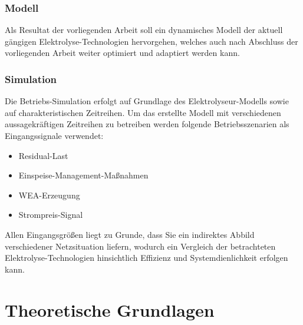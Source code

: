 \documentclass[onecolumn,10pt,titlepage]{article}
\begin{document}
\subsubsection{Modell}
Als Resultat der vorliegenden Arbeit soll ein dynamisches Modell der aktuell gängigen Elektrolyse-Technologien hervorgehen, welches auch nach Abschluss der vorliegenden Arbeit weiter optimiert und adaptiert werden kann.\\

\subsubsection{Simulation}
Die Betriebs-Simulation erfolgt auf Grundlage des Elektrolyseur-Modells sowie auf charakteristischen Zeitreihen. Um das erstellte Modell mit verschiedenen aussagekräftigen Zeitreihen zu betreiben werden folgende Betriebsszenarien als Eingangssignale verwendet:
\begin{itemize}
	\item Residual-Last
	\item Einspeise-Management-Maßnahmen
	\item WEA-Erzeugung
	\item Strompreis-Signal
\end{itemize}
Allen Eingangsgrößen liegt zu Grunde, dass Sie ein indirektes Abbild verschiedener Netzsituation liefern, wodurch ein Vergleich der betrachteten Elektrolyse-Technologien hinsichtlich Effizienz und Systemdienlichkeit erfolgen kann.

%

\section{Theoretische Grundlagen}
\end{document}
